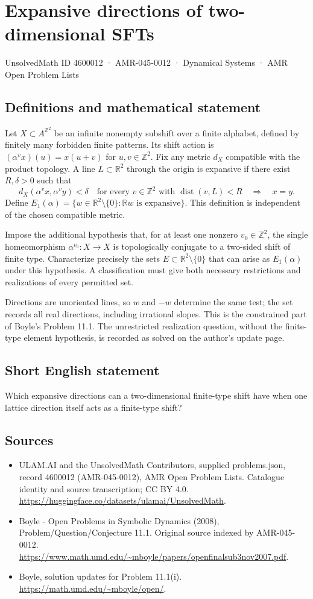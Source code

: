 \documentclass[11pt,a4paper]{article}
\begin{document}
\section*{Expansive directions of two-dimensional SFTs}\label{4600012}
{\small UnsolvedMath ID 4600012 · AMR-045-0012 · Dynamical Systems · AMR Open Problem Lists}
\subsection{Definitions and mathematical statement}
Let $X\subset A^{\mathbb Z^2}$ be an infinite nonempty subshift over a finite
alphabet, defined by finitely many forbidden finite patterns. Its shift
action is $(\alpha^v x)(u)=x(u+v)$ for $u,v\in\mathbb Z^2$. Fix any metric
$d_X$ compatible with the product topology. A line $L\subset\mathbb R^2$
through the origin is expansive if there exist $R,\delta>0$ such that
\[
 d_X(\alpha^v x,\alpha^v y)<\delta\quad
 \text{for every }v\in\mathbb Z^2\text{ with }\operatorname{dist}(v,L)<R
 \quad\Longrightarrow\quad x=y.
\]
Define $E_1(\alpha)=\{w\in\mathbb R^2\setminus\{0\}:\mathbb Rw
\text{ is expansive}\}$. This definition is independent of the chosen
compatible metric.

Impose the additional hypothesis that, for at least one nonzero
$v_0\in\mathbb Z^2$, the single homeomorphism $\alpha^{v_0}:X\to X$ is
topologically conjugate to a two-sided shift of finite type. Characterize
precisely the sets $E\subset\mathbb R^2\setminus\{0\}$ that can arise as
$E_1(\alpha)$ under this hypothesis. A classification must give both
necessary restrictions and realizations of every permitted set.

Directions are unoriented lines, so $w$ and $-w$ determine the same test;
the set records all real directions, including irrational slopes.
This is the constrained part of Boyle's Problem 11.1. The unrestricted
realization question, without the finite-type element hypothesis, is
recorded as solved on the author's update page.
\subsection{Short English statement}
Which expansive directions can a two-dimensional finite-type shift have when one lattice direction itself acts as a finite-type shift?
\subsection{Sources}
\begin{itemize}
\item[S1] ULAM.AI and the UnsolvedMath Contributors, supplied problems.json, record 4600012 (AMR-045-0012), AMR Open Problem Lists. Catalogue identity and source transcription; CC BY 4.0.
\url{https://huggingface.co/datasets/ulamai/UnsolvedMath}.
\item[S2] Boyle - Open Problems in Symbolic Dynamics (2008), Problem/Question/Conjecture 11.1. Original source indexed by AMR-045-0012.
\url{https://www.math.umd.edu/~mboyle/papers/openfinalsub3nov2007.pdf}.
\item[S3] Boyle, solution updates for Problem 11.1(i).
\url{https://math.umd.edu/~mboyle/open/}.
\end{itemize}
\end{document}
